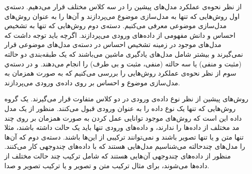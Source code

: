 \documentclass[12pt,a4paper]{article}
\begin{document}
از نظر نحوه‌ی عملکرد مدل‌های پیشین را در سه‌  کلاس مختلف قرار می‌‌دهیم. دسته‌ي اول روش‌هایی که تنها به مدل‌سازی موضوع می‌‌پردازند و آن‌ها را به عنوان روش‌های مدل‌سازی موضوعی معرفی‌ می‌‌کنیم. دسته‌ی دوم روش‌هایی که تنها به تشخیص احساس و دانش مفهومی‌ از داده‌های ورودی می‌‌پردازند. اگرچه باید توجه داشت که مدل‌های موجود در زمینه تشخیص احساس در دسته‌ی مدل‌های موضوعی قرار نمی‌‌گیرند و بیشتر شامل مدل‌های یادگیری ماشین می‌‌باشند که یک طبقه‌بندی دو حالته (مثبت و منفی‌) یا سه‌ حالته (منفی‌، مثبت و بی‌ طرف) را انجام می‌‌دهند. 
و در دسته‌‌ي سوم از نظر نحوه‌ی عملکرد روش‌هایی را بررسی می‌کنیم که به صورت همزمان به مدل‌سازی موضوع و احساس بر روی داده‌ی ورودی می‌‌پردازند.  

روش‌های پیشین از نظر نوع داده‌ی ورودی در دو کلاس متفاوت قرار می‌‌گیرند. یک گروه روش‌هایی که تنها یک نوع داده را به عنوان ورودی قبول می‌‌کنند. منظور از یک مدل داده این است که روش‌های موجود توانایی عمل کردن به صورت همزمان بر روی چند مد مختلف از داده‌ها را ندارند، و داده‌های ورودی تنها باید یک حالت داشته باشند، مثلا تنها متن و یا تنها تصویر باشند و نمی‌‌توانند ترکیبی‌ از این‌ها باشند. دسته‌ی دوم که آن‌ها را مدل‌های چندحالته می‌‌شناسیم مدل‌هایی هستند که با داده‌های چندوجهی کار می‌‌کنند. منظور از داده‌های چندوجهی آن‌هایی هستند که شامل ترکیب چند حالت مختلف از داد‌ه‌ها می‌شوند، برای مثال ترکیب متن و تصویر و یا ترکیب تصویر و صدا. 
\end{document}
